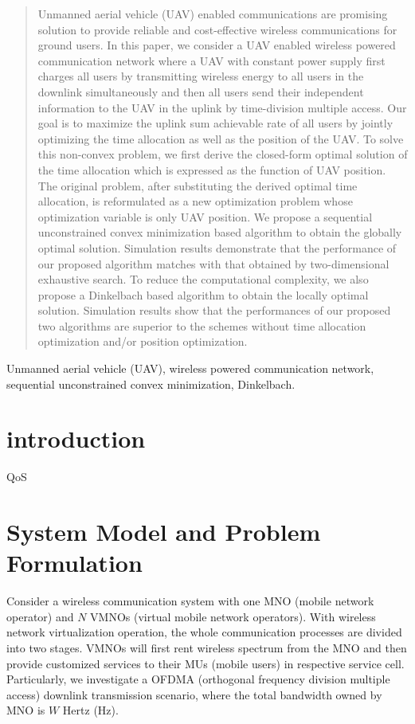 \documentclass[journal]{IEEEtran}
\begin{document}
\maketitle
\begin{abstract}
Unmanned aerial vehicle (UAV) enabled communications are promising solution to provide reliable and cost-effective wireless communications
for ground users. In this paper, we consider a UAV enabled wireless powered communication network where a UAV with constant power supply first charges all users by transmitting wireless energy to all users in the downlink simultaneously and then all users send their independent information to the UAV in the uplink by time-division multiple access. Our goal is to maximize the uplink sum achievable rate of all users by jointly optimizing the time allocation as well as the position of the UAV. To solve this non-convex problem, we first derive the closed-form optimal solution of the time allocation which is expressed as the function of UAV position. The original problem, after substituting the derived optimal time allocation, is reformulated as a new optimization problem whose optimization variable is only UAV position. We propose a sequential unconstrained convex minimization based algorithm to obtain the globally optimal solution. Simulation results demonstrate that the performance of our proposed algorithm matches with that obtained by two-dimensional exhaustive search. To reduce the computational complexity, we also propose a Dinkelbach based algorithm to obtain the locally optimal solution. Simulation results show that the performances of our proposed two algorithms are superior to the schemes without time allocation optimization and/or position optimization.
\end{abstract}
\begin{IEEEkeywords} Unmanned aerial vehicle (UAV), wireless powered communication network, sequential unconstrained convex minimization, Dinkelbach.
\end{IEEEkeywords}
\IEEEpeerreviewmaketitle
	
\section{introduction}

QoS
\section{System Model and Problem Formulation}

Consider a wireless communication system with one MNO (mobile network operator) and $N$ VMNOs (virtual mobile network operators). With wireless network virtualization operation, the whole communication processes are divided into two stages. VMNOs will first rent wireless spectrum from the MNO and then provide customized services to their MUs (mobile users) in respective service cell. Particularly, we investigate a OFDMA (orthogonal frequency division multiple access) downlink transmission scenario, where the total bandwidth owned by MNO is $W$ Hertz (Hz). 
\end{document}
